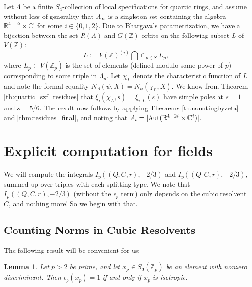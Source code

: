 \documentclass{article}
\def\Z{{\mathbb Z}}
\def\Aut{{\rm Aut}}
\def\R{{\mathbb R}}
\def\Z{{\mathbb Z}}
\def\C{{\mathbb C}}
\newtheorem{lemma}[theorem]{Lemma}
\begin{document}
\medskip

 Let $\Lambda$ be a finite $S_4$-collection of local specifications for quartic rings, and assume without loss of generality that $\Lambda_\infty$ is a singleton set containing the algebra $\R^{4-2i}\times \C^i$ for some $i\in\{0,1,2\}$. Due to Bhargava's parametrization, we have a bijection between the set $R(\Lambda)$ and $G(\Z)$-orbits on the following subset $L$ of $V(\Z)$:
\begin{equation*}
L:=V(\Z)^{(i)}\bigcap \cap_{p\in S} L_p,
\end{equation*}
where $L_p\subset V(\Z_p)$ is the set of elements (defined modulo some power of $p$) corresponding to some triple in $\Lambda_p$. Let $\chi_L$ denote the characteristic function of $L$ and note the formal equality $N_\Lambda(\psi,X)=N_\psi(\chi_L,X)$. We know from Theorem \ref{th:quartic_szf_residues} that  $\xi_i(\chi_L,s)=\xi_{i,L}(s)$ have simple poles at $s=1$ and $s=5/6$. The result now follows by applying Theorems \ref{th:countingbyzeta} and \ref{thm:residues_final}, and noting that
$A_i=|\Aut(\R^{4-2i}\times\C^i)|$.


\section{Explicit computation for fields}

We will compute the integrals $I_p((Q,C,r),-2/3)$ and $I_p((Q,C,r),-2/3)$, summed up over triples with each splitting type. We note that $I_p((Q,C,r),-2/3)$ (without the $\epsilon_p$ term) only depends on the cubic resolvent $C$, and nothing more! So we begin with that.

\subsection{Counting Norms in Cubic Resolvents}

The following result will be convenient for us:

\begin{lemma}\label{lem:isotropicifhasse}
    Let $p>2$ be prime, and let $x_p\in S_3(\Z_p)$ be an element with nonzero discriminant. Then $\epsilon_p(x_p)=1$ if and only if $x_p$ is isotropic.
\end{lemma}
\end{document}
